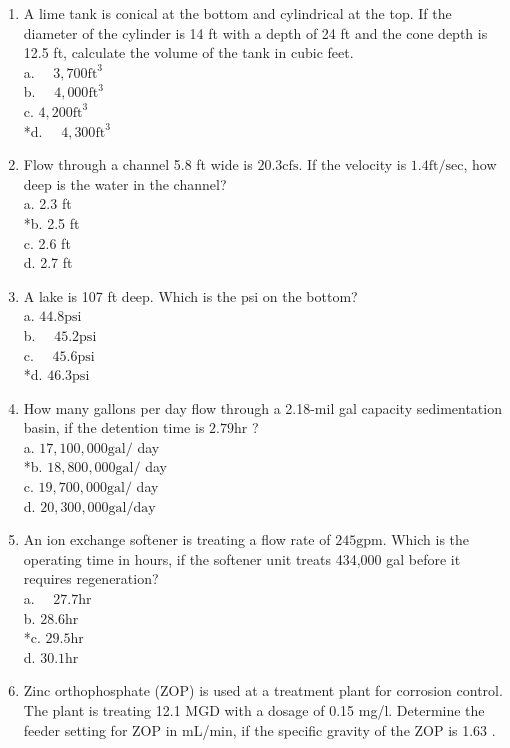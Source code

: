 \begin{enumerate}
  \item A lime tank is conical at the bottom and cylindrical at the top. If the diameter of the cylinder is 14 ft with a depth of 24 ft and the cone depth is 12.5 ft, calculate the volume of the tank in cubic feet.\\
a. $\quad 3,700 \mathrm{ft}^{3}$\\
b. $\quad 4,000 \mathrm{ft}^{3}$\\
c. $4,200 \mathrm{ft}^{3}$\\
*d. $\quad 4,300 \mathrm{ft}^{3}$ 
  \item Flow through a channel 5.8 ft wide is $20.3 \mathrm{cfs}$. If the velocity is $1.4 \mathrm{ft} / \mathrm{sec}$, how deep is the water in the channel?\\
a. 2.3 ft\\
*b. 2.5 ft\\
c. 2.6 ft\\
d. 2.7 ft\\
  \item A lake is 107 ft deep. Which is the psi on the bottom?\\
a. $44.8 \mathrm{psi}$\\
b. $\quad 45.2 \mathrm{psi}$\\
c. $\quad 45.6 \mathrm{psi}$\\
*d. $46.3 \mathrm{psi}$\\
  \item How many gallons per day flow through a 2.18-mil gal capacity sedimentation basin, if the detention time is $2.79 \mathrm{hr}$ ?\\
a. $17,100,000 \mathrm{gal} /$ day\\
*b. $18,800,000 \mathrm{gal} /$ day\\
c. $19,700,000 \mathrm{gal} /$ day\\
d. $20,300,000 \mathrm{gal} / \mathrm{day}$\\
  \item An ion exchange softener is treating a flow rate of $245 \mathrm{gpm}$. Which is the operating time in hours, if the softener unit treats 434,000 gal before it requires regeneration?\\
a. $\quad 27.7 \mathrm{hr}$\\
b. $28.6 \mathrm{hr}$\\
*c. $29.5 \mathrm{hr}$\\
d. $30.1 \mathrm{hr}$\\
  \item Zinc orthophosphate (ZOP) is used at a treatment plant for corrosion control. The plant is treating 12.1 MGD with a dosage of 0.15 mg/l. Determine the feeder setting for ZOP in mL/min, if the specific gravity of the ZOP is 1.63 .\\

\end{enumerate}

